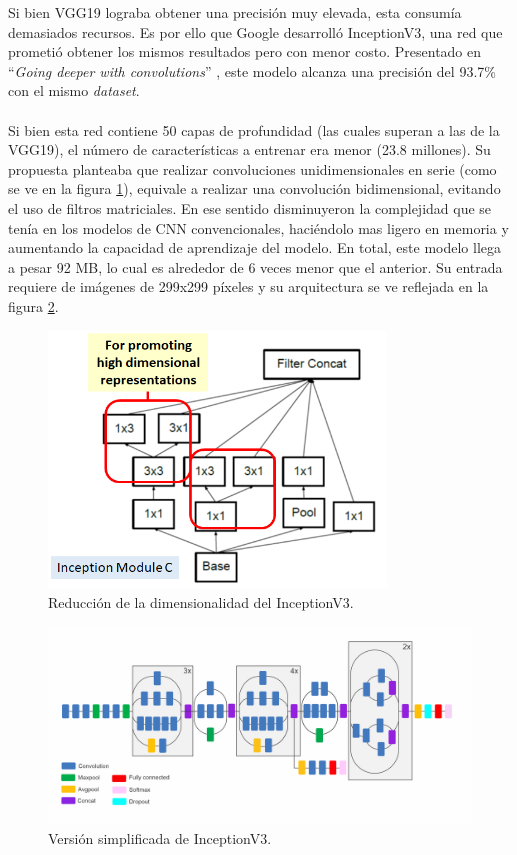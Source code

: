 Si bien VGG19 lograba obtener una precisión muy elevada, esta consumía demasiados 
recursos. Es por ello que Google desarrolló InceptionV3, una red que prometió obtener los 
mismos resultados pero con menor costo. Presentado en ``\textit{Going deeper with convolutions}'' 
\cite{Szegedy2014}, este modelo alcanza una precisión del 93.7\% con el mismo \textit{dataset}. 
\\\\
Si bien esta red contiene 50 capas de profundidad (las cuales superan a las de la VGG19), el 
número de características a entrenar era menor (23.8 millones). Su propuesta planteaba que
realizar convoluciones unidimensionales en serie (como se ve en la figura \ref{InceptionLayer}), 
equivale a realizar una convolución bidimensional, evitando el uso de filtros matriciales. 
En ese sentido disminuyeron la complejidad que se tenía en los modelos de CNN convencionales, 
haciéndolo mas ligero en memoria y aumentando la capacidad de aprendizaje del modelo. En total, 
este modelo llega a pesar 92 MB, lo cual es alrededor de 6 veces menor que el anterior. Su 
entrada requiere de imágenes de 299x299 píxeles y su arquitectura se ve reflejada en la figura 
\ref{Inceptionv3}.

\begin{figure}[h!]
\includegraphics[width=0.8\textwidth]{images/InceptionLayer.png}
\centering
\caption{Reducción de la dimensionalidad del InceptionV3. \protect\cite{modelos} }
\label{InceptionLayer}
\end{figure}

\begin{figure}[h!]
\includegraphics[width=1\textwidth]{images/InceptionV3.png}
\centering
\caption{Versión simplificada de InceptionV3. \protect\cite{modelos} }
\label{Inceptionv3}
\end{figure}

